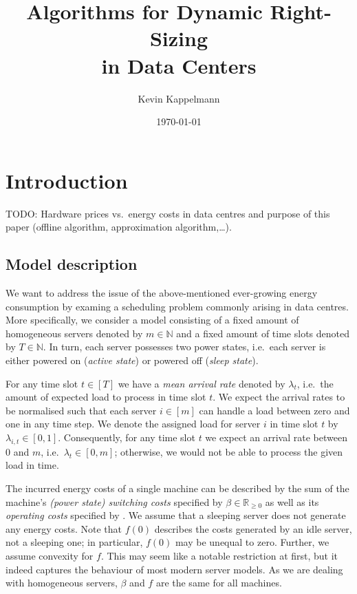 \documentclass[hidelinks]{article}
\title{\textbf{Algorithms for Dynamic Right-Sizing\\in Data Centers}}
\author{Kevin Kappelmann}
\affil{Chair for Theoretical Computer Science,\\ Technical University of Munich}
\date{\today}
\theoremstyle{plain}
\theoremstyle{definition}
\theoremstyle{rem}
\begin{document}
\maketitle
\newpage
\tableofcontents 
\newpage


\section{Introduction}
TODO: Hardware prices vs.\ energy costs in data centres and purpose of this paper (offline algorithm, approximation algorithm,\ldots).

\subsection{Model description}\label{sec_model_descr}
We want to address the issue of the above-mentioned ever-growing energy consumption by examing a scheduling problem commonly arising in data centres. More specifically, we consider a model consisting of a fixed amount of homogeneous servers denoted by $m\in\mathbb{N}$ and a fixed amount of time slots denoted by $T\in\mathbb{N}$. In turn, each server possesses two power states, i.e.\ each server is either powered on (\textit{active state}) or powered off (\textit{sleep state}).
	
For any time slot $t\in[T]$ we have a \textit{mean arrival rate} denoted by $\lambda_t$, i.e.\ the amount of expected load to process in time slot $t$. We expect the arrival rates to be normalised such that each server $i\in[m]$ can handle a load between zero and one in any time step. We denote the assigned load for server $i$ in time slot $t$ by $\lambda_{i,t}\in[0,1]$. Consequently, for any time slot $t$ we expect an arrival rate between $0$ and $m$, i.e.\ $\lambda_t\in[0,m]$; otherwise, we would not be able to process the given load in time.

The incurred energy costs of a single machine can be described by the sum of the machine's \textit{(power state) switching costs} specified by $\beta\in\mathbb{R}_{\ge 0}$ as well as its \textit{operating costs} specified by . We assume that a sleeping server does not generate any energy costs. Note that $f(0)$ describes the costs generated by an idle server, not a sleeping one; in particular, $f(0)$ may be unequal to zero. Further, we assume convexity for $f$. This may seem like a notable restriction at first, but it indeed captures the behaviour of most modern server models. As we are dealing with homogeneous servers, $\beta$ and $f$ are the same for all machines.
\end{document}
